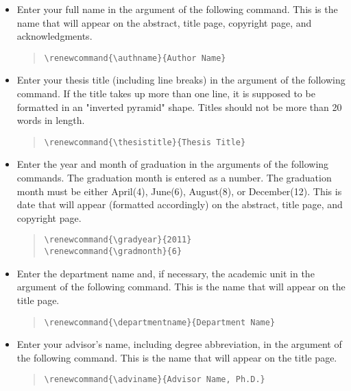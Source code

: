 \documentclass{wmu-thesis}
\begin{document}
\begin{itemize}
	\item Enter your full name in the argument of the following command.  This is the name that will appear on the abstract, title page, copyright page, and acknowledgments.
	\vspace*{-5pt}%
\begin{quote}
\verb|\renewcommand{\authname}{Author Name}|
\end{quote}
\item Enter your thesis title (including line breaks) in the argument of the following command.  If the title takes up more than one line, it is supposed to be formatted in an "inverted pyramid" shape.  Titles should not be more than 20 words in length.  
	\vspace*{-5pt}%
\begin{quote}
\verb|\renewcommand{\thesistitle}{Thesis Title}|
\end{quote}
\item Enter the year and month of graduation in the arguments of the following commands.  The graduation month is entered as a number.  The graduation month must be either April(4),  June(6),  August(8),  or December(12).  This is date that will appear (formatted accordingly) on the abstract, title page, and copyright page.
	\vspace*{-5pt}%
\begin{quote}
\begin{verbatim}
\renewcommand{\gradyear}{2011}
\renewcommand{\gradmonth}{6}
\end{verbatim}
\end{quote}
\item Enter the department name and, if necessary, the academic unit in the argument of the following command.  This is the name that will appear on the title page.
	\vspace*{-5pt}%
\begin{quote}
\verb|\renewcommand{\departmentname}{Department Name}|
\end{quote}
\item Enter your advisor's name, including degree abbreviation, in the argument of the following command.  This is the name that will appear on the title page.
	\vspace*{-5pt}%
\begin{quote}
\verb|\renewcommand{\adviname}{Advisor Name, Ph.D.}|
\end{quote}
\end{itemize}
\end{document}
